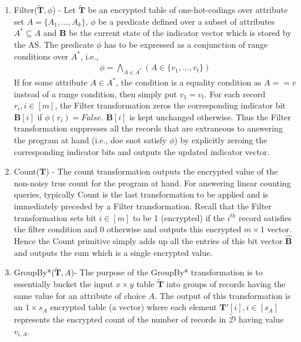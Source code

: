 \begin{enumerate}
  \item \textsf{Filter}($\tilde{\mathbf{T}},\phi$) - Let $\tilde{\mathbf{T}}$ be an encrypted table of one-hot-codings over attribute set $A=\{A_1,...,A_k\}$, $\phi$ be a  predicate defined over a subset of attributes $A^*\subseteq A$ and $\mathbf{B}$ be the current state of the indicator vector which is stored by the \textsf{AS}. The predicate $\phi$ has to be expressed as a conjunction of range conditions over $A^*$, i.e.,\begin{gather}\phi = \bigwedge_{A \in A^*}(A \in \{v_{1},\ldots,v_{t}\} ) \label{phi} \end{gather} If for some attribute $A \in A^*$, the condition is a equality condition as $A==v$ instead of a range condition, then simply put $v_1=v_t$. For each record $r_i, i \in [m]$, the Filter transformation zeros the corresponding indicator bit $\mathbf{B}[i] $ if $\phi(r_i)=False$. $\mathbf{B}[i] $ is kept unchanged otherwise. Thus the \textsf{Filter} transformation suppresses all the records that are extraneous to answering the program at hand (i.e., doe snot satisfy $\phi$) by explicitly zeroing the corresponding indicator bits and outputs the updated indicator vector. %
    \item{Count($\mathbf{T}$) } - The count transformation outputs the encrypted value of the non-noisy true count for the program at hand. For answering linear counting queries, typically \textsf{Count}  is the last transformation to be applied and is immediately preceded by a \textsf{Filter} transformation. Recall that the \textsf{Filter} transformation sets bit $i \in [m]$ to be 1 (encrypted) if the $i^{th}$ record satisfies the filter condition and 0 otherwise and outputs this encrypted $m\times 1$ vector. Hence the \textsf{Count} primitive simply adds up all the entries of this bit vector $\hat{\mathbf{B}}$ and  outputs the sum which is a single encrypted value. 
    \item{GroupBy*($\mathbf{\tilde{T}},A$)}- The purpose of the \textsf{GroupBy*} transformation is to essentially bucket the input $x\times y$ table $\mathbf{\tilde{T}}$ into groups of records having the same value for an attribute of choice $A$. The output of this transformation is an $1\times s_A$ encrypted table (a vector)  where each element $\mathbf{T'}[i], i \in [s_A]$ represents the encrypted count of the number of records in $\boldsymbol{\tilde{\mathcal{D}}}$ having value $v_{i,A}$.

\end{enumerate}
